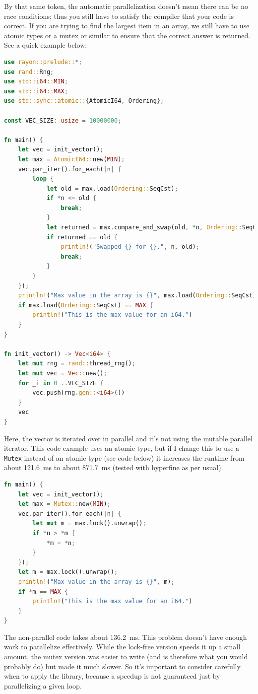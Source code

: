\documentclass[a4paper]{report}
\begin{document}
By that same token, the automatic parallelization doesn't mean there can be no race conditions; thus you still have to satisfy the compiler that your code is correct. If you are trying to find the largest item in an array, we still have to use atomic types or a mutex or similar to ensure that the correct answer is returned. See a quick example below:

\begin{lstlisting}[language=Rust]
use rayon::prelude::*;
use rand::Rng;
use std::i64::MIN;
use std::i64::MAX;
use std::sync::atomic::{AtomicI64, Ordering};

const VEC_SIZE: usize = 10000000;

fn main() {
    let vec = init_vector();
    let max = AtomicI64::new(MIN);
    vec.par_iter().for_each(|n| {
        loop {
            let old = max.load(Ordering::SeqCst);
            if *n <= old {
                break;
            }
            let returned = max.compare_and_swap(old, *n, Ordering::SeqCst);
            if returned == old {
                println!("Swapped {} for {}.", n, old);
                break;
            }
        }
    });
    println!("Max value in the array is {}", max.load(Ordering::SeqCst));
    if max.load(Ordering::SeqCst) == MAX {
        println!("This is the max value for an i64.")
    }
}

fn init_vector() -> Vec<i64> {
    let mut rng = rand::thread_rng();
    let mut vec = Vec::new();
    for _i in 0 ..VEC_SIZE {
        vec.push(rng.gen::<i64>())
    }
    vec
}
\end{lstlisting}

Here, the vector is iterated over in parallel and it's not using the mutable parallel iterator. This code example uses an atomic type, but if I change this to use a \texttt{Mutex} instead of an atomic type (see code below) it increases the runtime from about 121.6~ms to about 871.7~ms (tested with hyperfine as per usual).

\begin{lstlisting}[language=Rust]
fn main() {
    let vec = init_vector();
    let max = Mutex::new(MIN);
    vec.par_iter().for_each(|n| {
        let mut m = max.lock().unwrap();
        if *n > *m {
            *m = *n;
        }
    });
    let m = max.lock().unwrap();
    println!("Max value in the array is {}", m);
    if *m == MAX {
        println!("This is the max value for an i64.")
    }
}
\end{lstlisting}

 The non-parallel code takes about 136.2~ms. This problem doesn't have enough work to parallelize effectively. While the lock-free version speeds it up a small amount, the mutex version was easier to write (and is therefore what you would probably do) but made it much slower. So it's important to consider carefully when to apply the library, because a speedup is not guaranteed just by parallelizing a given loop.
\end{document}
